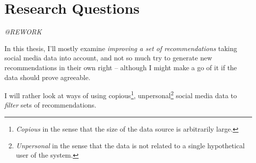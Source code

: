 % 
% 
% 
% 



\section{Research Questions}

\emph{@REWORK}

In this thesis, I'll mostly examine \emph{improving a set of recommendations} taking social media data into account, and not so much try to generate new recommendations in their own right -- although I might make a go of it if the data should prove agreeable.

I will rather look at ways of using copious\footnote{\emph{Copious} in the sense that the size of the data source is arbitrarily large.}, unpersonal\footnote{\emph{Unpersonal} in the sense that the data is not related to a single hypothetical user of the system.} social media data to \emph{filter} sets of recommendations.

